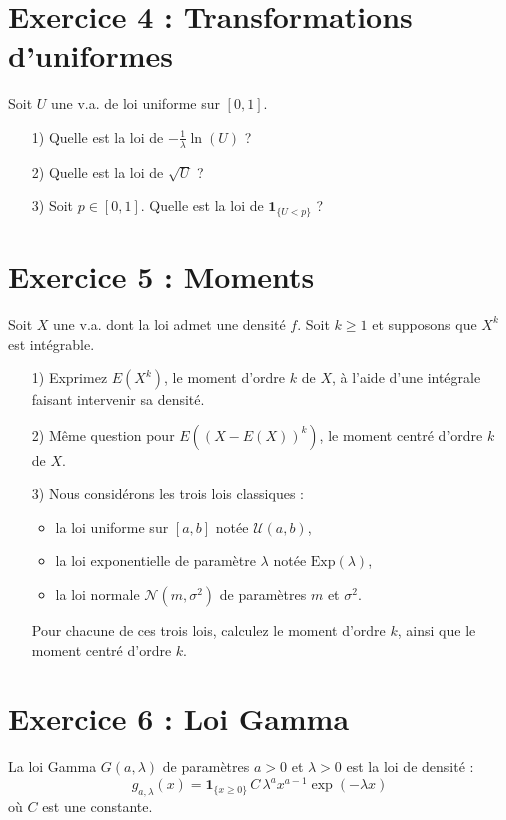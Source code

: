 \documentclass[12pt,a4paper]{article}
\begin{document}
\section*{Exercice 4 : Transformations d’uniformes}
Soit $U$ une v.a. de loi uniforme sur $[0,1]$.
\begin{enumerate}
    \item[1)] Quelle est la loi de $-\frac{1}{\lambda}\ln(U)$ ?
    \item[2)] Quelle est la loi de $\sqrt{U}$ ?
    \item[3)] Soit $p \in [0,1]$. Quelle est la loi de $\mathbf{1}_{\{U < p\}}$ ?
\end{enumerate}

\section*{Exercice 5 : Moments}
Soit $X$ une v.a. dont la loi admet une densité $f$. Soit $k \geq 1$ et supposons que $X^k$ est intégrable.
\begin{enumerate}
    \item[1)] Exprimez $E(X^k)$, le moment d’ordre $k$ de $X$, à l’aide d’une intégrale faisant intervenir sa densité.
    \item[2)] Même question pour $E((X - E(X))^k)$, le moment centré d’ordre $k$ de $X$.
    \item[3)] Nous considérons les trois lois classiques :
    \begin{itemize}
        \item la loi uniforme sur $[a,b]$ notée $\mathcal{U}(a,b)$,
        \item la loi exponentielle de paramètre $\lambda$ notée $\mathrm{Exp}(\lambda)$,
        \item la loi normale $\mathcal{N}(m,\sigma^2)$ de paramètres $m$ et $\sigma^2$.
    \end{itemize}
    Pour chacune de ces trois lois, calculez le moment d’ordre $k$, ainsi que le moment centré d’ordre $k$.
\end{enumerate}

\section*{Exercice 6 : Loi Gamma}

La loi Gamma $G(a,\lambda)$ de paramètres $a > 0$ et $\lambda > 0$ est la loi de densité :
\[
g_{a,\lambda}(x) = \mathbf{1}_{\{x \geq 0\}} \, C \, \lambda^a x^{a-1} \exp(-\lambda x)
\]
où $C$ est une constante.
\end{document}
